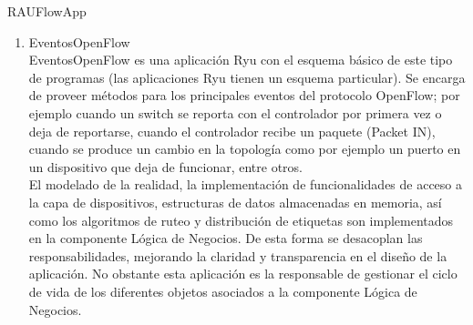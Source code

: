 \begin{subsubsection}{RAUFlowApp}





\begin{enumerate}

\item EventosOpenFlow\\
EventosOpenFlow es una aplicaci\'on Ryu con el esquema b\'asico de este tipo de programas (las aplicaciones Ryu tienen un esquema particular). Se encarga de proveer m\'etodos para los principales eventos del protocolo OpenFlow; por ejemplo cuando un switch se reporta con el controlador por primera vez o deja de reportarse, cuando el controlador recibe un paquete (Packet IN), cuando se produce un cambio en la topolog\'ia como por ejemplo un puerto en un dispositivo que deja de funcionar, entre otros.\\

El modelado de la realidad, la implementaci\'on de funcionalidades de acceso a la capa de dispositivos, estructuras de datos almacenadas en memoria, así como los algoritmos de ruteo y distribución de etiquetas son implementados en la componente Lógica de Negocios. De esta forma se desacoplan las responsabilidades, mejorando la claridad y transparencia en el diseño de la aplicaci\'on. No obstante esta aplicación es la responsable de gestionar el ciclo de vida de los diferentes objetos asociados a la componente Lógica de Negocios.
  

\end{enumerate}
\end{subsubsection}
